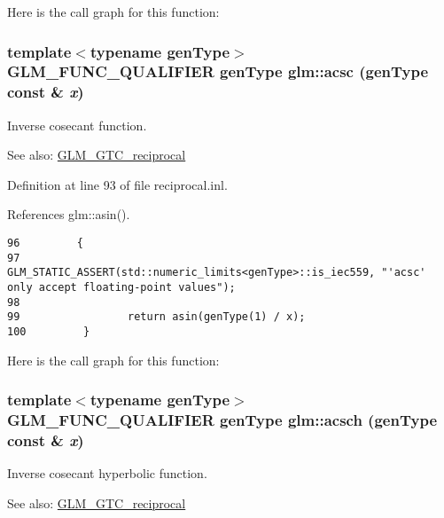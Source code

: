 Here is the call graph for this function:\hypertarget{group__gtc__reciprocal_g921be8522fbf0a5cfc877e78fb9abed2}{
\subsubsection[acsc]{\setlength{\rightskip}{0pt plus 5cm}template$<$typename genType$>$ GLM\_\-FUNC\_\-QUALIFIER genType glm::acsc (genType const \& {\em x})}}
\label{group__gtc__reciprocal_g921be8522fbf0a5cfc877e78fb9abed2}


Inverse cosecant function.

\begin{Desc}
\item[See also:]\hyperlink{group__gtc__reciprocal}{GLM\_\-GTC\_\-reciprocal} \end{Desc}


Definition at line 93 of file reciprocal.inl.

References glm::asin().

\begin{Code}\begin{verbatim}96         {
97                 GLM_STATIC_ASSERT(std::numeric_limits<genType>::is_iec559, "'acsc' only accept floating-point values");
98 
99                 return asin(genType(1) / x);
100         }
\end{verbatim}
\end{Code}




Here is the call graph for this function:\hypertarget{group__gtc__reciprocal_gb24c5c23d9d3d10517ad80f5af515b0e}{
\subsubsection[acsch]{\setlength{\rightskip}{0pt plus 5cm}template$<$typename genType$>$ GLM\_\-FUNC\_\-QUALIFIER genType glm::acsch (genType const \& {\em x})}}
\label{group__gtc__reciprocal_gb24c5c23d9d3d10517ad80f5af515b0e}


Inverse cosecant hyperbolic function.

\begin{Desc}
\item[See also:]\hyperlink{group__gtc__reciprocal}{GLM\_\-GTC\_\-reciprocal} \end{Desc}


